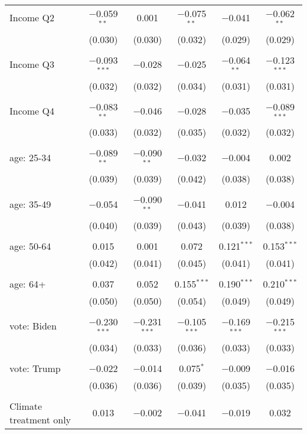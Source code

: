 \begin{tabular}{@{\extracolsep{5pt}}lccccc}
 Income Q2 & $-$0.059$^{**}$ & 0.001 & $-$0.075$^{**}$ & $-$0.041 & $-$0.062$^{**}$ \\ 
  & (0.030) & (0.030) & (0.032) & (0.029) & (0.029) \\ 
  & & & & & \\ 
 Income Q3 & $-$0.093$^{***}$ & $-$0.028 & $-$0.025 & $-$0.064$^{**}$ & $-$0.123$^{***}$ \\ 
  & (0.032) & (0.032) & (0.034) & (0.031) & (0.031) \\ 
  & & & & & \\ 
 Income Q4 & $-$0.083$^{**}$ & $-$0.046 & $-$0.028 & $-$0.035 & $-$0.089$^{***}$ \\ 
  & (0.033) & (0.032) & (0.035) & (0.032) & (0.032) \\ 
  & & & & & \\ 
 age: 25-34 & $-$0.089$^{**}$ & $-$0.090$^{**}$ & $-$0.032 & $-$0.004 & 0.002 \\ 
  & (0.039) & (0.039) & (0.042) & (0.038) & (0.038) \\ 
  & & & & & \\ 
 age: 35-49 & $-$0.054 & $-$0.090$^{**}$ & $-$0.041 & 0.012 & $-$0.004 \\ 
  & (0.040) & (0.039) & (0.043) & (0.039) & (0.038) \\ 
  & & & & & \\ 
 age: 50-64 & 0.015 & 0.001 & 0.072 & 0.121$^{***}$ & 0.153$^{***}$ \\ 
  & (0.042) & (0.041) & (0.045) & (0.041) & (0.041) \\ 
  & & & & & \\ 
 age: 64+ & 0.037 & 0.052 & 0.155$^{***}$ & 0.190$^{***}$ & 0.210$^{***}$ \\ 
  & (0.050) & (0.050) & (0.054) & (0.049) & (0.049) \\ 
  & & & & & \\ 
 vote: Biden & $-$0.230$^{***}$ & $-$0.231$^{***}$ & $-$0.105$^{***}$ & $-$0.169$^{***}$ & $-$0.215$^{***}$ \\ 
  & (0.034) & (0.033) & (0.036) & (0.033) & (0.033) \\ 
  & & & & & \\ 
 vote: Trump & $-$0.022 & $-$0.014 & 0.075$^{*}$ & $-$0.009 & $-$0.016 \\ 
  & (0.036) & (0.036) & (0.039) & (0.035) & (0.035) \\ 
  & & & & & \\ 
 Climate treatment only & 0.013 & $-$0.002 & $-$0.041 & $-$0.019 & 0.032 \\ 

\end{tabular}
